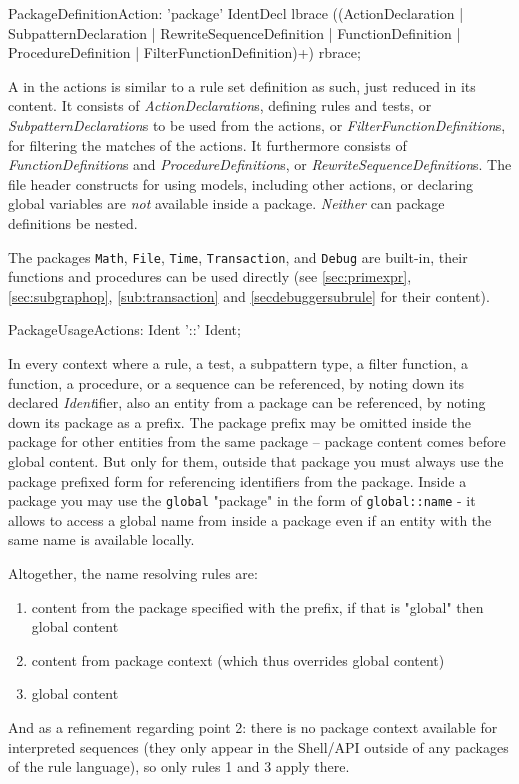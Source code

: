 \begin{rail}
  PackageDefinitionAction: 'package' IdentDecl lbrace ((ActionDeclaration | SubpatternDeclaration | RewriteSequenceDefinition | FunctionDefinition | ProcedureDefinition | FilterFunctionDefinition)+) rbrace;
\end{rail}

A  in the actions is similar to a rule set definition as such, just reduced in its content.
It consists of \emph{ActionDeclaration}s, defining rules and tests, or \emph{SubpatternDeclaration}s to be used from the actions, or \emph{FilterFunctionDefinition}s, for filtering the matches of the actions.
It furthermore consists of \emph{FunctionDefinition}s and \emph{ProcedureDefinition}s, or \emph{RewriteSequenceDefinition}s. 
The file header constructs for using models, including other actions, or declaring global variables are \emph{not} available inside a package.
\emph{Neither} can package definitions be nested.

The packages \texttt{Math}, \texttt{File}, \texttt{Time}, \texttt{Transaction}, and \texttt{Debug} are built-in, their functions and procedures can be used directly (see \ref{sec:primexpr}, \ref{sec:subgraphop}, \ref{sub:transaction} and \ref{secdebuggersubrule} for their content).

\begin{rail}
  PackageUsageActions: Ident '::' Ident;
\end{rail}

In every context where a rule, a test, a subpattern type, a filter function, a function, a procedure, or a sequence can be referenced, by noting down its declared \emph{Ident}ifier, 
also an entity from a package can be referenced,
by noting down its package as a prefix.
The package prefix may be omitted inside the package for other entities from the same package -- package content comes before global content.
But only for them, outside that package you must always use the package prefixed form for referencing identifiers from the package.
Inside a package you may use the \texttt{global} "package" in the form of \texttt{global::name} - it allows to access a global name from inside a package even if an entity with the same name is available locally.

Altogether, the name resolving rules are:
\begin{enumerate}
	\item content from the package specified with the prefix, if that is "global" then global content
	\item content from package context (which thus overrides global content)
	\item global content 
\end{enumerate}
And as a refinement regarding point 2: there is no package context available for interpreted sequences (they only appear in the Shell/API outside of any packages of the rule language), so only rules 1 and 3 apply there.

